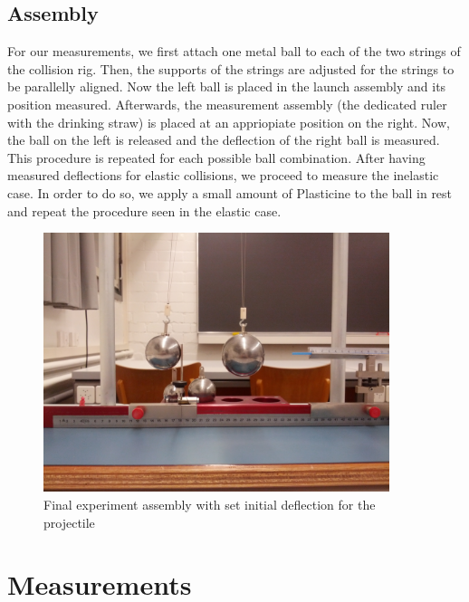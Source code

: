 \documentclass{scrreprt}
\begin{document}
\subsection{Assembly}
For our measurements, we first attach one metal ball to each of the two strings of the collision rig. Then, the supports of the strings are adjusted for the strings to be parallelly aligned. Now the left ball is placed in the launch assembly and its position measured. Afterwards, the measurement assembly (the dedicated ruler with the drinking straw) is placed at an appriopiate position on the right. Now, the ball on the left is released and the deflection of the right ball is measured. This procedure is repeated for each possible ball combination. After having measured deflections for elastic collisions, we proceed to measure the inelastic case. In order to do so, we apply a small amount of Plasticine to the ball in rest and repeat the procedure seen in the elastic case.  

\begin{figure}[H]
	\centering
  \includegraphics[width=0.9\textwidth]{img/assembly.jpg}
	\caption{Final experiment assembly with set initial deflection for the projectile}
	\label{fig:assembly}
\end{figure}

\section{Measurements}
\end{document}
